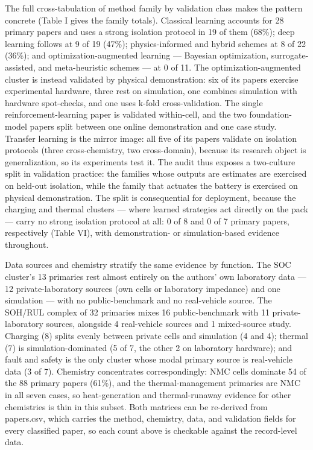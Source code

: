 \documentclass[journal]{IEEEtran}
\begin{document}
The full cross-tabulation of method family by validation class makes the pattern concrete (Table I gives the family totals). Classical learning accounts for 28 primary papers and uses a strong isolation protocol in 19 of them (68\%); deep learning follows at 9 of 19 (47\%); physics-informed and hybrid schemes at 8 of 22 (36\%); and optimization-augmented learning --- Bayesian optimization, surrogate-assisted, and meta-heuristic schemes --- at 0 of 11. The optimization-augmented cluster is instead validated by physical demonstration: six of its papers exercise experimental hardware, three rest on simulation, one combines simulation with hardware spot-checks, and one uses k-fold cross-validation. The single reinforcement-learning paper is validated within-cell, and the two foundation-model papers split between one online demonstration and one case study. Transfer learning is the mirror image: all five of its papers validate on isolation protocols (three cross-chemistry, two cross-domain), because its research object is generalization, so its experiments test it. The audit thus exposes a two-culture split in validation practice: the families whose outputs are estimates are exercised on held-out isolation, while the family that actuates the battery is exercised on physical demonstration. The split is consequential for deployment, because the charging and thermal clusters --- where learned strategies act directly on the pack --- carry no strong isolation protocol at all: 0 of 8 and 0 of 7 primary papers, respectively (Table VI), with demonstration- or simulation-based evidence throughout.

Data sources and chemistry stratify the same evidence by function. The SOC cluster's 13 primaries rest almost entirely on the authors' own laboratory data --- 12 private-laboratory sources (own cells or laboratory impedance) and one simulation --- with no public-benchmark and no real-vehicle source. The SOH/RUL complex of 32 primaries mixes 16 public-benchmark with 11 private-laboratory sources, alongside 4 real-vehicle sources and 1 mixed-source study. Charging (8) splits evenly between private cells and simulation (4 and 4); thermal (7) is simulation-dominated (5 of 7, the other 2 on laboratory hardware); and fault and safety is the only cluster whose modal primary source is real-vehicle data (3 of 7). Chemistry concentrates correspondingly: NMC cells dominate 54 of the 88 primary papers (61\%), and the thermal-management primaries are NMC in all seven cases, so heat-generation and thermal-runaway evidence for other chemistries is thin in this subset. Both matrices can be re-derived from papers.csv, which carries the method, chemistry, data, and validation fields for every classified paper, so each count above is checkable against the record-level data.
\end{document}
